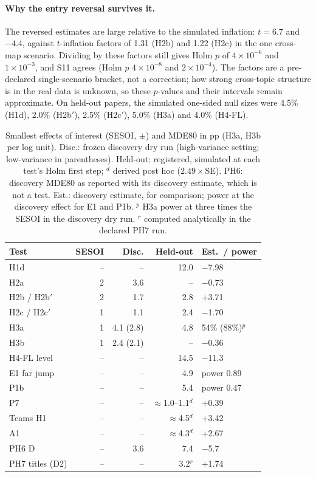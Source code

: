\paragraph{Why the entry reversal survives it.} The reversed estimates are large relative to the simulated inflation:
$t = 6.7$ and $-4.4$, against $t$-inflation factors of 1.31 (H2b) and 1.22 (H2c) in the one cross-map scenario.
Dividing by these factors still gives Holm $p$ of $4\times10^{-6}$ and $1\times10^{-3}$, and S11 agrees (Holm $p$
$4\times10^{-8}$ and $2\times10^{-4}$). The factors are a pre-declared single-scenario bracket, not a correction; how
strong cross-topic structure is in the real data is unknown, so these $p$-values and their intervals remain
approximate. On held-out papers, the simulated one-sided null sizes were 4.5\% (H1d), 2.0\% (H2b$'$), 2.5\% (H2c$'$),
5.0\% (H3a) and 4.0\% (H4-FL).

\begin{table}[t]
\centering\footnotesize
\setlength{\tabcolsep}{3pt}
\begin{tabular}{@{}lrrrl@{}}
\toprule
Test & SESOI & Disc. & Held-out & Est.\ / power \\
\midrule
H1d & -- & -- & 12.0 & $-$7.98 \\
H2a & 2 & 3.6 & -- & $-$0.73 \\
H2b / H2b$'$ & 2 & 1.7 & 2.8 & +3.71 \\
H2c / H2c$'$ & 1 & 1.1 & 2.4 & $-$1.70 \\
H3a & 1 & 4.1 (2.8) & 4.8 & 54\% (88\%)$^p$ \\
H3b & 1 & 2.4 (2.1) & -- & $-$0.36 \\
H4-FL level & -- & -- & 14.5 & $-$11.3 \\
E1 far jump & -- & -- & 4.9 & power 0.89 \\
P1b & -- & -- & 5.4 & power 0.47 \\
P7 & -- & -- & $\approx$1.0--1.1$^d$ & +0.39 \\
Teams H1 & -- & -- & $\approx$4.5$^d$ & +3.42 \\
A1 & -- & -- & $\approx$4.3$^d$ & +2.67 \\
PH6 D & -- & 3.6 & 7.4 & $-$5.7 \\
PH7 titles (D2) & -- & -- & 3.2$^r$ & +1.74 \\
\bottomrule
\end{tabular}
\caption{Smallest effects of interest (SESOI, $\pm$) and MDE80 in pp (H3a, H3b per log unit). Disc.: frozen
discovery dry run (high-variance setting; low-variance in parentheses). Held-out:
registered, simulated at each test's Holm first step; $^d$ derived post hoc ($2.49\times$SE). PH6: discovery MDE80 as
reported with its discovery estimate, which is not a test. Est.: discovery estimate, for comparison; power at the discovery effect for E1 and P1b. $^p$ H3a power at three
times the SESOI in the discovery dry run. $^r$ computed analytically in the declared PH7 run.}
\label{tab:app-mde}
\end{table}

